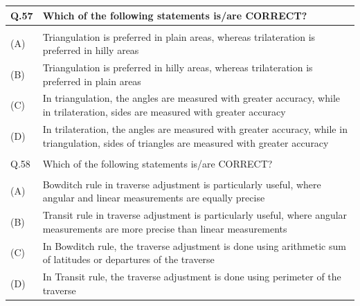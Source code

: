 \documentclass[12pt]{article}
\begin{document}
\begin{table}[H]
\renewcommand{\arraystretch}{3}
\setlength{\tabcolsep}{8pt}
\begin{tabular}{|l|p{15cm}|}
\hline
 
Q.57& Which of the following statements is/are CORRECT?\\ \hline 
 & \\ \hline
(A)&Triangulation is preferred in plain areas, whereas trilateration is preferred in hilly
areas\\ \hline
(B)&Triangulation is preferred in hilly areas, whereas trilateration is preferred in plain
areas\\ \hline
(C)&In triangulation, the angles are measured with greater accuracy, while in
trilateration, sides are measured with greater accuracy\\ \hline
(D)&In trilateration, the angles are measured with greater accuracy, while in
triangulation, sides of triangles are measured with greater accuracy\\ \hline
 & \\ \hline

Q.58 &Which of the following statements is/are CORRECT?\\ \hline
 & \\ \hline
(A)&Bowditch rule in traverse adjustment is particularly useful, where angular and linear
measurements are equally precise\\ \hline
(B)&Transit rule in traverse adjustment is particularly useful, where angular
measurements are more precise than linear measurements\\ \hline
(C)&In Bowditch rule, the traverse adjustment is done using arithmetic sum of latitudes
or departures of the traverse\\ \hline
(D)&In Transit rule, the traverse adjustment is done using perimeter of the traverse\\ \hline


\end{tabular}
\end{table}
\end{document}
